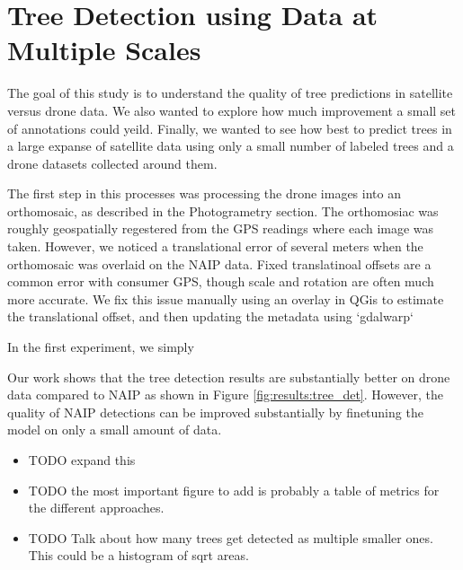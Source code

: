 \section{Tree Detection using Data at Multiple Scales}
The goal of this study is to understand the quality of tree predictions in satellite versus drone data. We also wanted to explore how much improvement a small set of annotations could yeild. Finally, we wanted to see how best to predict trees in a large expanse of satellite data using only a small number of labeled trees and a drone datasets collected around them.

The first step in this processes was processing the drone images into an orthomosaic, as described in the Photogrametry section. The orthomosiac was roughly geospatially regestered from the GPS readings where each image was taken. However, we noticed a translational error of several meters when the orthomosaic was overlaid on the NAIP data. Fixed translatinoal offsets are a common error with consumer GPS, though scale and rotation are often much more accurate. We fix this issue manually using an overlay in QGis to estimate the translational offset, and then updating the metadata using `gdalwarp`  


In the first experiment, we simply


Our work shows that the tree detection results are substantially better on drone data compared to NAIP as shown in Figure \ref{fig:results:tree_det}. However, the quality of NAIP detections can be improved substantially by finetuning the model on only a small amount of data.

\begin{itemize}
    \item TODO expand this
    \item TODO the most important figure to add is probably a table of metrics for the different approaches.
    \item TODO Talk about how many trees get detected as multiple smaller ones. This could be a histogram of sqrt areas. 
\end{itemize}

